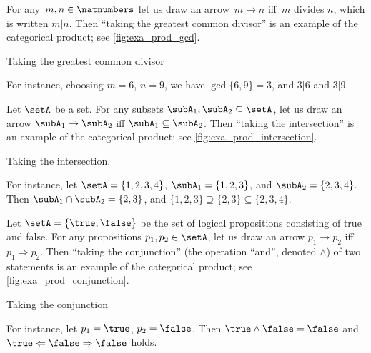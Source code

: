\begin{example}\label{exa:gcd-as-prod}
For any~$m, n \in \natnumbers$ let us draw an arrow~$m \to n$ iff~$m$ divides $n$, which is written $m | n$. Then ``taking the greatest common divisor'' is an example of the categorical product; see \cref{fig:exa_prod_gcd}.
  \begin{marginfigure}
  \begin{center}
  \end{center}
    \caption{Taking the greatest common divisor}
    \label{fig:exa_prod_gcd}
  \end{marginfigure}
 For instance, choosing $m = 6$, $n = 9$, we have $\gcd \{6, 9 \} = 3$, and $3 | 6$ and $3 | 9$.
\end{example}

\begin{example}\label{exa:intersection-as-prod}
Let $\setA$ be a set. For any subsets $\subA_1, \subA_2 \subseteq \setA$, let us draw an arrow $\subA_1 \to \subA_2$ iff $\subA_1 \subseteq \subA_2$.  Then ``taking the intersection'' is an example of the categorical product; see \cref{fig:exa_prod_intersection}.
  \begin{marginfigure}
  \begin{center}
  \end{center}
    \caption{Taking the intersection.}
    \label{fig:exa_prod_intersection}
  \end{marginfigure}
 For instance, let $\setA = \{ 1, 2, 3, 4 \}$, $\subA_1 = \{ 1, 2, 3 \}$, and $\subA_2 = \{2, 3, 4 \}$. Then $\subA_1 \cap \subA_2 = \{2, 3 \}$, and $\{ 1, 2, 3 \} \supseteq \{2, 3 \} \subseteq \{2, 3, 4 \}$.
\end{example}



\begin{example}\label{exa:conjunction-as-prod}
Let $\setA = \{ \true, \false \}$ be the set of logical propositions consisting of true and false. For any propositions $p_1, p_2  \in \setA$, let us draw an arrow $p_1 \to p_2$ iff $p_1 \Rightarrow p_2$. Then ``taking the conjunction'' (the operation ``and'', denoted $\wedge$) of two statements is an example of the categorical product; see \cref{fig:exa_prod_conjunction}.
  \begin{marginfigure}
  \begin{center}
  \end{center}
    \caption{Taking the conjunction}
    \label{fig:exa_prod_conjunction}
  \end{marginfigure}
 For instance, let $p_1 = \true$, $p_2 = \false$. Then $\true \wedge \false = \false$ and $\true \Leftarrow \false \Rightarrow \false$ holds.
\end{example}

